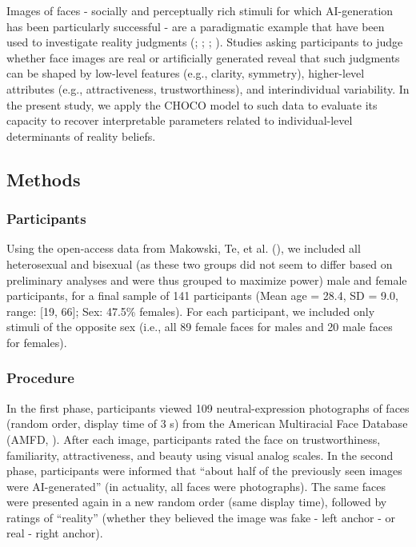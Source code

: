 \documentclass[
  jou,
  floatsintext,
  longtable,
  nolmodern,
  notxfonts,
  notimes,
  colorlinks=true,linkcolor=blue,citecolor=blue,urlcolor=blue]{apa7}
\begin{document}
Images of faces - socially and perceptually rich stimuli for which
AI-generation has been particularly successful - are a paradigmatic
example that have been used to investigate reality judgments
(;
;
;
).
Studies asking participants to judge whether face images are real or
artificially generated reveal that such judgments can be shaped by
low-level features (e.g., clarity, symmetry), higher-level attributes
(e.g., attractiveness, trustworthiness), and interindividual
variability. In the present study, we apply the CHOCO model to such data
to evaluate its capacity to recover interpretable parameters related to
individual-level determinants of reality beliefs.

\subsection{Methods}\label{methods}

\subsubsection{Participants}\label{participants}

Using the open-access data from Makowski, Te, et al.
(), we included all heterosexual and
bisexual (as these two groups did not seem to differ based on
preliminary analyses and were thus grouped to maximize power) male and
female participants, for a final sample of 141 participants (Mean age =
28.4, SD = 9.0, range: {[}19, 66{]}; Sex: 47.5\% females). For each
participant, we included only stimuli of the opposite sex (i.e., all 89
female faces for males and 20 male faces for females).

\subsubsection{Procedure}\label{procedure}

In the first phase, participants viewed 109 neutral-expression
photographs of faces (random order, display time of 3 s) from the
American Multiracial Face Database (AMFD,
). After each image,
participants rated the face on trustworthiness, familiarity,
attractiveness, and beauty using visual analog scales. In the second
phase, participants were informed that ``about half of the previously
seen images were AI-generated'' (in actuality, all faces were
photographs). The same faces were presented again in a new random order
(same display time), followed by ratings of ``reality'' (whether they
believed the image was fake - left anchor - or real - right anchor).
\end{document}
